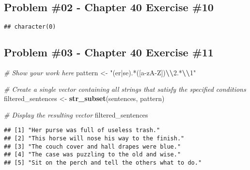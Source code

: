 \documentclass[
]{article}
\newenvironment{Shaded}{\begin{snugshade}}{\end{snugshade}}
\newcommand{\CommentTok}[1]{\textcolor[rgb]{0.56,0.35,0.01}{\textit{#1}}}
\newcommand{\FunctionTok}[1]{\textcolor[rgb]{0.13,0.29,0.53}{\textbf{#1}}}
\newcommand{\NormalTok}[1]{#1}
\newcommand{\OtherTok}[1]{\textcolor[rgb]{0.56,0.35,0.01}{#1}}
\newcommand{\SpecialCharTok}[1]{\textcolor[rgb]{0.81,0.36,0.00}{\textbf{#1}}}
\newcommand{\StringTok}[1]{\textcolor[rgb]{0.31,0.60,0.02}{#1}}
\begin{document}
\newpage

\hypertarget{problem-02---chapter-40-exercise-10}{%
\subsection{Problem \#02 - Chapter 40 Exercise
\#10}\label{problem-02---chapter-40-exercise-10}}

\begin{Shaded}
\end{Shaded}

\begin{verbatim}
## character(0)
\end{verbatim}

\newpage

\hypertarget{problem-03---chapter-40-exercise-11}{%
\subsection{Problem \#03 - Chapter 40 Exercise
\#11}\label{problem-03---chapter-40-exercise-11}}

\begin{Shaded}
\begin{Highlighting}[]
\CommentTok{\# Show your work here}
\NormalTok{pattern }\OtherTok{\textless{}{-}} \StringTok{"(er|se).*([a{-}zA{-}Z])}\SpecialCharTok{\textbackslash{}\textbackslash{}}\StringTok{2.*}\SpecialCharTok{\textbackslash{}\textbackslash{}}\StringTok{1"}

\CommentTok{\# Create a single vector containing all strings that satisfy the specified conditions}
\NormalTok{filtered\_sentences }\OtherTok{\textless{}{-}} \FunctionTok{str\_subset}\NormalTok{(sentences, pattern)}

\CommentTok{\# Display the resulting vector}
\NormalTok{ filtered\_sentences}
\end{Highlighting}
\end{Shaded}

\begin{verbatim}
## [1] "Her purse was full of useless trash."            
## [2] "This horse will nose his way to the finish."     
## [3] "The couch cover and hall drapes were blue."      
## [4] "The case was puzzling to the old and wise."      
## [5] "Sit on the perch and tell the others what to do."
\end{verbatim}
\end{document}
